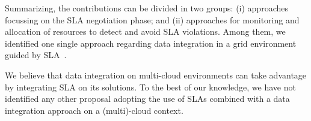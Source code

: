 \documentclass[12pt,a4paper,oneside]{report}
\begin{document}
Summarizing, the contributions can be divided in two groups: (i) approaches focussing on the SLA negotiation phase; and (ii) approaches for monitoring and allocation of resources  to detect and avoid SLA violations. Among them, we identified one single approach regarding data integration in a grid environment guided by SLA~\cite{Nie07}.

%
%
%


We believe that data integration on multi-cloud environments can take advantage by integrating SLA on its solutions. To the best of our knowledge, we have not identified any other proposal adopting the use of SLAs combined with a data integration approach on a (multi)-cloud context.
\end{document}
